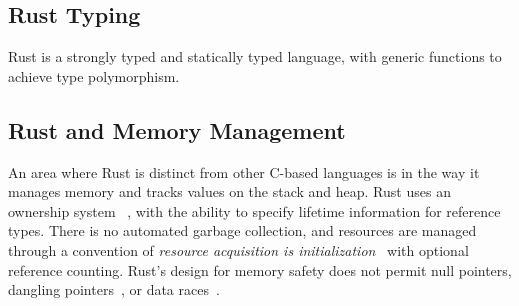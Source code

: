 \subsection{Rust Typing}

Rust is a strongly typed and statically typed language, with generic functions to achieve type polymorphism.

\subsection{Rust and Memory Management}

An area where Rust is distinct from other C-based languages is in the way it manages memory and tracks values on the stack and heap. Rust uses an ownership system~\cite[Chapter~4]{programming.rust.2021} , with the ability to specify lifetime information for reference types. There is no automated garbage collection, and resources are managed through a convention of \textit{resource acquisition is initialization}~\cite{cpp.design.evolution.1994} with optional reference counting. Rust's design for memory safety does not permit null pointers, dangling pointers~\cite{taste.of.rust.2013}, or data races~\cite[Chapter~8.1]{rustonomicon}.
